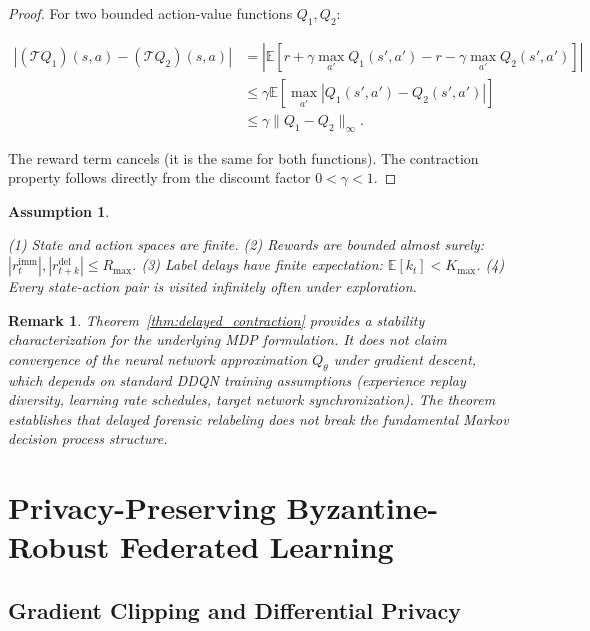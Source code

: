 \documentclass[preprint,12pt]{elsarticle}
\newtheorem{remark}{Remark}
\newtheorem{assumption}{Assumption}
\begin{document}
\begin{proof}

For two bounded action-value functions $Q_1, Q_2$:

\begin{align}
|(\mathcal{T}Q_1)(s, a) - (\mathcal{T}Q_2)(s, a)|
&= \left| \mathbb{E}[r + \gamma \max_{a'} Q_1(s', a') - r - \gamma \max_{a'} Q_2(s', a')] \right| \\
&\le \gamma \mathbb{E}[\max_{a'} |Q_1(s', a') - Q_2(s', a')|] \\
&\le \gamma \|Q_1 - Q_2\|_\infty.
\end{align}

The reward term cancels (it is the same for both functions). The contraction property follows directly from the discount factor $0 < \gamma < 1$.

\end{proof}

\begin{assumption}
\label{ass:mdp}

(1) State and action spaces are finite. (2) Rewards are bounded almost surely: $|r_t^{\text{imm}}|, |r_{t+k}^{\text{del}}| \le R_{\max}$. (3) Label delays have finite expectation: $\mathbb{E}[k_t] < K_{\max}$. (4) Every state-action pair is visited infinitely often under exploration.

\end{assumption}

\begin{remark}

Theorem~\ref{thm:delayed_contraction} provides a stability characterization for the underlying MDP formulation. It does not claim convergence of the neural network approximation $Q_\theta$ under gradient descent, which depends on standard DDQN training assumptions (experience replay diversity, learning rate schedules, target network synchronization). The theorem establishes that delayed forensic relabeling does not break the fundamental Markov decision process structure.

\end{remark}

\section{Privacy-Preserving Byzantine-Robust Federated Learning}
\label{sec:federated}

\subsection{Gradient Clipping and Differential Privacy}
\end{document}
